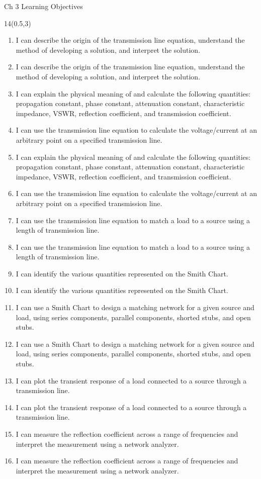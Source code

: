 \def\obja{I can describe the origin of the transmission line equation, understand the method of developing a solution, and interpret the solution.}
\def\objb{I can explain the physical meaning of and calculate the following quantities: propagation constant, phase constant, attenuation constant, characteristic impedance, VSWR, reflection coefficient, and transmission coefficient.}
\def\objc{I can use the transmission line equation to calculate the voltage/current at an arbitrary point on a specified transmission line.}
\def\objd{ I can use the transmission line equation to match a load to a source using a length of transmission line.}
\def\obje{ I can identify the various quantities represented on the Smith Chart.}
\def\objf{ I can use a Smith Chart to design a matching network for a given source and load, using series components, parallel components, shorted stubs, and open stubs.}
\def\objg{ I can plot the transient response of a load connected to a source through a transmission line. }
\def\objh{ I can measure the reflection coefficient across a range of frequencies and interpret the measurement using a network analyzer.}
\begin{frame}{Ch 3 Learning Objectives}
	\begin{textblock}{14}(0.5,3)
	\begin{scriptsize}
	\begin{enumerate}[{3}.1]
		\ifnum{}
			\item \alert{ \obja }
		\else 
			\item \obja
		\fi 
		\ifnum{}
			\item \alert{ \objb }
			\item \alert{ \objc }
		\else 
			\item \objb
			\item \objc
		\fi 
		\ifnum{}
			\item \alert{ \objd }
		\else 
			\item \objd
		\fi 
		\ifnum{}
			\item \alert{ \obje }
		\else 
			\item \obje
		\fi 
		\ifnum{}
			\item \alert{ \objf }
		\else 
			\item \objf
		\fi 
		\ifnum{}
			\item \alert{ \objg }
		\else 
			\item \objg
		\fi 
		\ifnum{}
			\item \alert{ \objh }
		\else 
			\item \objh
		\fi 

	\end{enumerate}
	\end{scriptsize}
	\end{textblock}
\end{frame}